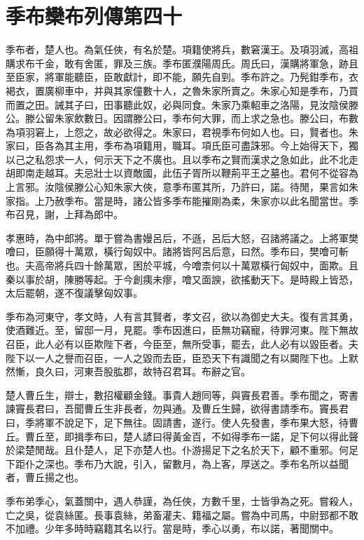 \chapter{季布欒布列傳第四十}

季布者，楚人也。為氣任俠，有名於楚。項籍使將兵，數窘漢王。及項羽滅，高祖購求布千金，敢有舍匿，罪及三族。季布匿濮陽周氏。周氏曰，漢購將軍急，跡且至臣家，將軍能聽臣，臣敢獻計，即不能，願先自剄。季布許之。乃髡鉗季布，衣褐衣，置廣柳車中，并與其家僮數十人，之魯朱家所賣之。朱家心知是季布，乃買而置之田。誡其子曰，田事聽此奴，必與同食。朱家乃乘軺車之洛陽，見汝陰侯滕公。滕公留朱家飲數日。因謂滕公曰，季布何大罪，而上求之急也。滕公曰，布數為項羽窘上，上怨之，故必欲得之。朱家曰，君視季布何如人也。曰，賢者也。朱家曰，臣各為其主用，季布為項籍用，職耳。項氏臣可盡誅邪。今上始得天下，獨以己之私怨求一人，何示天下之不廣也。且以季布之賢而漢求之急如此，此不北走胡即南走越耳。夫忌壯士以資敵國，此伍子胥所以鞭荊平王之墓也。君何不從容為上言邪。汝陰侯滕公心知朱家大俠，意季布匿其所，乃許曰，諾。待閒，果言如朱家指。上乃赦季布。當是時，諸公皆多季布能摧剛為柔，朱家亦以此名聞當世。季布召見，謝，上拜為郎中。

孝惠時，為中郎將。單于嘗為書嫚呂后，不遜，呂后大怒，召諸將議之。上將軍樊噲曰，臣願得十萬眾，橫行匈奴中。諸將皆阿呂后意，曰然。季布曰，樊噲可斬也。夫高帝將兵四十餘萬眾，困於平城，今噲柰何以十萬眾橫行匈奴中，面欺。且秦以事於胡，陳勝等起。于今創痍未瘳，噲又面諛，欲搖動天下。是時殿上皆恐，太后罷朝，遂不復議擊匈奴事。

季布為河東守，孝文時，人有言其賢者，孝文召，欲以為御史大夫。復有言其勇，使酒難近。至，留邸一月，見罷。季布因進曰，臣無功竊寵，待罪河東。陛下無故召臣，此人必有以臣欺陛下者，今臣至，無所受事，罷去，此人必有以毀臣者。夫陛下以一人之譽而召臣，一人之毀而去臣，臣恐天下有識聞之有以闚陛下也。上默然慚，良久曰，河東吾股肱郡，故特召君耳。布辭之官。

楚人曹丘生，辯士，數招權顧金錢。事貴人趙同等，與竇長君善。季布聞之，寄書諫竇長君曰，吾聞曹丘生非長者，勿與通。及曹丘生歸，欲得書請季布。竇長君曰，季將軍不說足下，足下無往。固請書，遂行。使人先發書，季布果大怒，待曹丘。曹丘至，即揖季布曰，楚人諺曰得黃金百，不如得季布一諾，足下何以得此聲於梁楚閒哉。且仆楚人，足下亦楚人也。仆游揚足下之名於天下，顧不重邪。何足下距仆之深也。季布乃大說，引入，留數月，為上客，厚送之。季布名所以益聞者，曹丘揚之也。

季布弟季心，氣蓋關中，遇人恭謹，為任俠，方數千里，士皆爭為之死。嘗殺人，亡之吳，從袁絲匿。長事袁絲，弟畜灌夫、籍福之屬。嘗為中司馬，中尉郅都不敢不加禮。少年多時時竊籍其名以行。當是時，季心以勇，布以諾，著聞關中。

